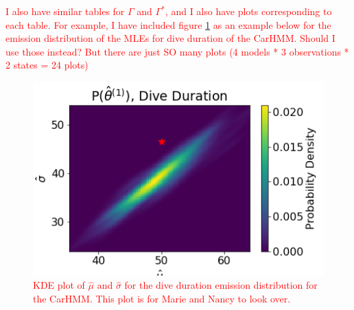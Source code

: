 \textcolor{red}{I also have similar tables for $\Gamma$ and $\Gamma^*$, and I also have plots corresponding to each table. For example, I have included figure \ref{fig:MLE_dist} as an example below for the emission distribution of the MLEs for dive duration of the CarHMM. Should I use those instead? But there are just SO many plots (4 models * 3 observations * 2 states = 24 plots)}

\begin{figure}[!ht]
	\centering
	\includegraphics[width=5in]{../Plots/hmm_FV_MLE_density_dive_duration_-1.png}
	\caption{\textcolor{red}{KDE plot of $\hat \mu$ and $\hat \sigma$ for the dive duration emission distribution for the CarHMM. This plot is for Marie and Nancy to look over.}}
	\label{fig:MLE_dist}
\end{figure}




